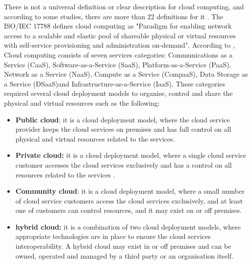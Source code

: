 There is not a universal definition or clear description for cloud computing, and according to some studies, there are more than 22 definitions for it \cite{Sultan2014}. The ISO/IEC 17788 defines cloud computing as "Paradigm for enabling network access to a scalable and elastic pool of shareable physical
or virtual resources with self-service provisioning and administration on-demand". According to \cite{BSI2014}, Cloud computing consists of seven services categories: Communications as a Service (CaaS), Software-as-a-Service (SaaS), Platform-as-a-Service (PaaS), Network as a Service (NaaS), Compute as a Service (CompaaS), Data Storage as a Service (DSaaS)and Infrastructure-as-a-Service (IaaS). These categories required several cloud deployment models to organise, control and share the physical and virtual resources such as the following: 
\begin{itemize} 
	\item \textbf{Public cloud}: it is a cloud deployment model, where the cloud service provider keeps the cloud services on premises and has full control on all physical and virtual resources related to the services\cite{BSI2014}. %
	
	\item \textbf{Private cloud:} it is a cloud deployment model, where a single cloud service customer accesses the cloud services exclusively and has a control on all resources related to the services \cite{BSI2014}.%
	
	\item \textbf{Community cloud}: it is a cloud deployment model, where a small number of cloud service customers access the cloud services exclusively, and at least one of customers can control resources, and it may exist on or off premises\cite{BSI2014}.%
	
	\item \textbf{hybrid cloud:} it is a combination of two cloud deployment models, where appropriate technologies are in place to ensure the cloud services interoperability. A hybrid cloud may exist in or off premises and can be owned, operated and managed by a third party or an organisation itself\cite{BSI2014}.
	
\end{itemize}

